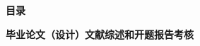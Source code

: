 \documentclass[UTF8,a4paper,twoside]{article}
\begin{document}
    
    \newpage
    \pagestyle{Require}
    
	
    \newpage
    \pagestyle{Index}
    \begin{center}
         \bfseries 目录
    \end{center}
    \tableofcontents
    \noindent {}\bfseries \hspace{0.36em}毕业论文（设计）文献综述和开题报告考核
    \newpage 
	\ \\ 
    \newpage
    
    
    
    

    \newpage
    
	
			
\end{document}
